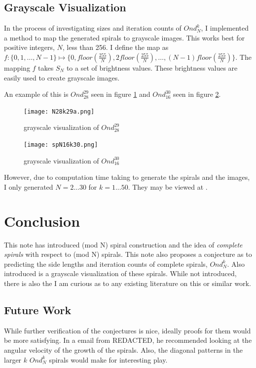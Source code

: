 \documentclass[11pt]{amsart}
\theoremstyle{mydef}
\begin{document}
\subsection{Grayscale Visualization}

In the process of investigating sizes and iteration counts of $Ond^k_N$, I implemented a method to map the generated spirals to grayscale images. This works best for positive integers, $N$, less than 256. I define the map as $f : \{ 0, 1, \ldots, N-1 \} \mapsto \{ 0, floor(\frac{255}{N}), 2floor(\frac{255}{N}), \ldots, (N-1)floor(\frac{255}{N}) \}$. The mapping $f$ takes $S_N$ to a set of brightness values. These brightness values are easily used to create grayscale images.

An example of this is $Ond^{29}_{28}$ seen in figure \ref{fig:viz2928} and $Ond^{30}_{16}$ seen in figure \ref{fig:viz1630}.

\begin{figure}[h]
\centering
\texttt{[image: N28k29a.png]}
\caption{grayscale visualization of $Ond^{29}_{28}$}
\label{fig:viz2928}
\end{figure}

\begin{figure}
\centering
\texttt{[image: spN16k30.png]}
\caption{grayscale visualization of $Ond^{30}_{16}$}
\label{fig:viz1630}
\end{figure}

However, due to computation time taking to generate the spirals and the images, I only generated $N=2...30$ for $k=1...50$. They may be viewed at \cite{GraySquare}.

\section{Conclusion}
This note has introduced (mod N) spiral construction and the idea of \textit{complete spirals} with respect to (mod N) spirals. This note also proposes a conjecture as to predicting the side lengths and iteration counts of complete spirals, $Ond^k_N$. Also introduced is a grayscale visualization of these spirals. While not introduced, there is also the I am curious as to any existing literature on this or similar work.

\subsection{Future Work}
While further verification of the conjectures is nice, ideally proofs for them would be more satisfying. In a email from REDACTED, he recommended looking at the angular velocity of the growth  of the spirals. Also, the diagonal patterns in the larger $k$ $Ond^k_N$ spirals would make for interesting play.
\end{document}
